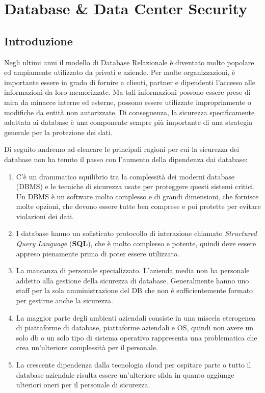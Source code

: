 \chapter{Database \& Data Center Security}

\section{Introduzione}

Negli ultimi anni il modello di Database Relazionale è diventato molto popolare ed ampiamente utilizzato da
privati e aziende.
Per molte organizzazioni, è importante essere in grado di
fornire a clienti, partner e dipendenti l'accesso alle informazioni da loro memorizzate. Ma tali
informazioni possono essere prese di mira da minacce interne ed esterne, possono essere utilizzate
impropriamente o modifiche da entità non autorizzate. Di conseguenza, la sicurezza
specificamente adattata ai database è una componente sempre più importante di una strategia generale per la protezione dei dati.

Di seguito andremo ad elencare le principali ragioni per cui la sicurezza dei database non ha tenuto il passo con
l'aumento della dipendenza dai database:

\begin{enumerate}
      \item C'è un drammatico squilibrio tra la complessità dei moderni
            database (DBMS) e le tecniche di sicurezza usate per proteggere questi
            sistemi critici. Un DBMS è un software molto complesso e di grandi
            dimensioni, che fornisce molte opzioni, che devono essere tutte ben
            comprese e poi protette per evitare violazioni dei dati.
      \item I database hanno un sofisticato protocollo di interazione chiamato
            \textit{Structured Query Language} (\textbf{SQL}),
            che è molto complesso e potente, quindi deve essere appreso pienamente
            prima di poter essere utilizzato.
      \item La mancanza di personale specializzato. L'azienda media non ha
            personale addetto alla gestione della sicurezza di database.
            Generalmente hanno uno staff per la sola amministrazione del DB che
            non è sufficientemente formato per gestirne anche la sicurezza.
      \item La maggior parte degli ambienti aziendali consiste in una miscela
            eterogenea di piattaforme di database, piattaforme aziendali e OS,
            quindi non avere un solo db o un solo tipo di sistema operativo
            rappresenta una problematica che crea un'ulteriore complessità per il
            personale.
      \item La crescente dipendenza dalla tecnologia cloud per ospitare parte o
            tutto il database aziendale risulta essere un'ulteriore sfida in quanto
            aggiunge ulteriori oneri per il
            personale di sicurezza.
\end{enumerate}

